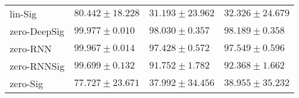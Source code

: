 \begin{tabular}{llll}
lin-Sig        &                          $ 80.442 \pm 18.228 $ &                          $ 31.193 \pm 23.962 $ &                          $ 32.326 \pm 24.679 $ \\
zero-DeepSig   &               $  \mathbf{ 99.977 \pm 0.010 } $ &                           $ 98.030 \pm 0.357 $ &                           $ 98.189 \pm 0.358 $ \\
zero-RNN       &                           $ 99.967 \pm 0.014 $ &                           $ 97.428 \pm 0.572 $ &                           $ 97.549 \pm 0.596 $ \\
zero-RNNSig    &                           $ 99.699 \pm 0.132 $ &                           $ 91.752 \pm 1.782 $ &                           $ 92.368 \pm 1.662 $ \\
zero-Sig       &                          $ 77.727 \pm 23.671 $ &                          $ 37.992 \pm 34.456 $ &                          $ 38.955 \pm 35.232 $ \\
\bottomrule
\end{tabular}
